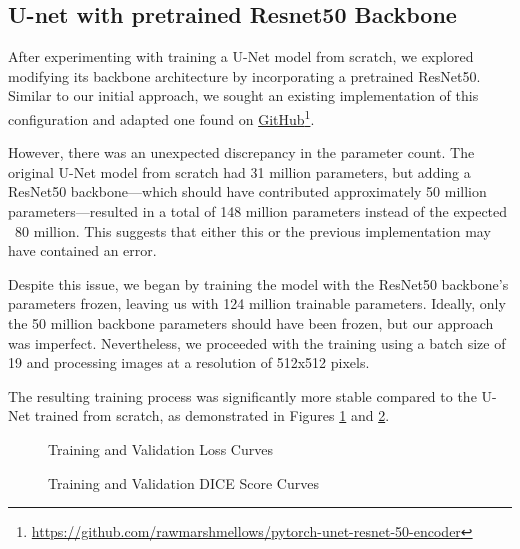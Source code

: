 \subsection{U-net with pretrained Resnet50 Backbone}

After experimenting with training a U-Net model from scratch, we explored modifying its backbone 
architecture by incorporating a pretrained ResNet50. Similar to our initial approach, we sought 
an existing implementation of this configuration and adapted one found on \href{https://github.com/rawmarshmellows/pytorch-unet-resnet-50-encoder}{GitHub}\footnote{\url{https://github.com/rawmarshmellows/pytorch-unet-resnet-50-encoder}}. 

However, there was an unexpected discrepancy in the parameter count. The original U-Net model from 
scratch had 31 million parameters, but adding a ResNet50 backbone—which should have contributed 
approximately 50 million parameters—resulted in a total of 148 million parameters instead of the 
expected ~80 million. This suggests that either this or the previous implementation may have 
contained an error.

Despite this issue, we began by training the model with the ResNet50 backbone's parameters frozen, 
leaving us with 124 million trainable parameters. Ideally, only the 50 million backbone parameters 
should have been frozen, but our approach was imperfect. Nevertheless, we proceeded with the training 
using a batch size of 19 and processing images at a resolution of 512x512 pixels.

The resulting training process was significantly more stable compared to the U-Net trained from 
scratch, as demonstrated in Figures \ref{fig:renet50_frozen_loss_curve} and \ref{fig:renet50_frozen_dice_curve}.


\begin{figure}[ht]
    \centering
    \caption{Training and Validation Loss Curves}
    \label{fig:renet50_frozen_loss_curve}
\end{figure}

\begin{figure}[ht]
    \centering
    \caption{Training and Validation DICE Score Curves}
    \label{fig:renet50_frozen_dice_curve}
\end{figure}

